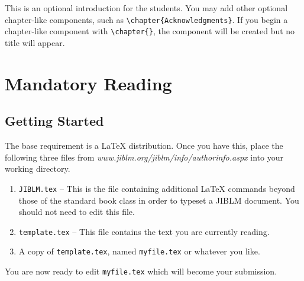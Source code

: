 
This is an optional introduction for the students.  You may add other
optional chapter-like components, such as
\verb|\chapter{Acknowledgments}|.  If you begin a chapter-like
component with \verb|\chapter{}|, the component will be created but
no title will appear.




\mainmatter




\chapter{Mandatory Reading}

\section{Getting Started}

The base requirement is  a \LaTeX{} distribution. Once you have this, place the following
three files from \emph{www.jiblm.org/jiblm/info/authorinfo.aspx} into your working directory.

\begin{enumerate}
    \item \texttt{JIBLM.tex} -- This is the file containing additional \LaTeX{} commands
    beyond those of the standard book class in order to typeset a JIBLM document.  You should not need
    to edit this file.
    \item \texttt{template.tex} -- This file contains the text you are currently reading.
    \item A copy of \texttt{template.tex}, named \texttt{myfile.tex} or whatever you like.
\end{enumerate}

\noindent
You are now ready to edit \texttt{myfile.tex} which will become your submission.

